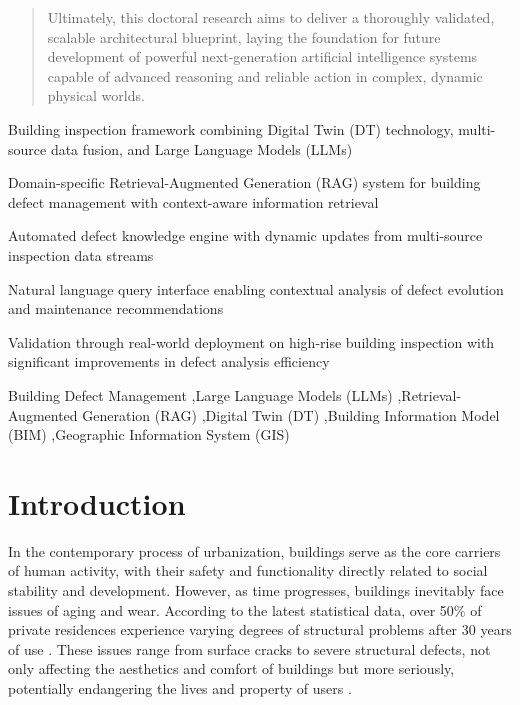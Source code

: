 \documentclass[a4paper,fleqn]{cas-sc}
\begin{document}
\begin{abstract}
Ultimately, this doctoral research aims to deliver a thoroughly validated, scalable architectural blueprint, laying the foundation for future development of powerful next-generation artificial intelligence systems capable of advanced reasoning and reliable action in complex, dynamic physical worlds.
\end{abstract}

\nolinenumbers
\begin{highlights}
\item Building inspection framework combining Digital Twin (DT) technology, multi-source data fusion, and Large Language Models (LLMs)
\item Domain-specific Retrieval-Augmented Generation (RAG) system for building defect management with context-aware information retrieval
\item Automated defect knowledge engine with dynamic updates from multi-source inspection data streams
\item Natural language query interface enabling contextual analysis of defect evolution and maintenance recommendations
\item Validation through real-world deployment on high-rise building inspection with significant improvements in defect analysis efficiency
\end{highlights}
\linenumbers

\begin{keywords}
Building Defect Management \sep Large Language Models (LLMs) \sep Retrieval-Augmented Generation (RAG) \sep Digital Twin (DT) \sep Building Information Model (BIM) \sep Geographic Information System (GIS)
\end{keywords}

\maketitle

\section{Introduction}

In the contemporary process of urbanization, buildings serve as the core carriers of human activity, with their safety and functionality directly related to social stability and development. However, as time progresses, buildings inevitably face issues of aging and wear. According to the latest statistical data, over 50\% of private residences experience varying degrees of structural problems after 30 years of use \cite{spencer2019advances}. These issues range from surface cracks to severe structural defects, not only affecting the aesthetics and comfort of buildings but more seriously, potentially endangering the lives and property of users \cite{zhang2023automated}.
\end{document}
